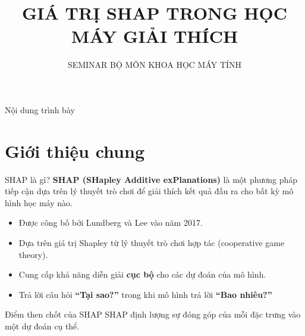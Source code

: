 \documentclass[notheorems, aspectratio=149]{beamer}
\title{GIÁ TRỊ SHAP TRONG HỌC MÁY GIẢI THÍCH}
\subtitle{SEMINAR BỘ MÔN KHOA HỌC MÁY TÍNH}
\begin{document}
\begin{frame}[plain]
    \titlepage{}
\end{frame}

\begin{frame}{Nội dung trình bày}
    \tableofcontents
\end{frame}


\section{Giới thiệu chung}

\begin{frame}{SHAP là gì?}
\textbf{SHAP (SHapley Additive exPlanations)} là một phương pháp tiếp cận dựa trên lý thuyết trò chơi để giải thích kết quả đầu ra cho bất kỳ mô hình học máy nào.

\vspace{0.5cm}
\begin{itemize}
    \item Được công bố bởi Lundberg và Lee vào năm 2017.
    \item Dựa trên giá trị Shapley từ lý thuyết trò chơi hợp tác (cooperative game theory).
    \item Cung cấp khả năng diễn giải \textbf{cục bộ} cho các dự đoán của mô hình.
    \item Trả lời câu hỏi \textbf{``Tại sao?''} trong khi mô hình trả lời \textbf{``Bao nhiêu?''}
\end{itemize}

\vspace{0.3cm}
\begin{alertblock}{Điểm then chốt của SHAP}
SHAP định lượng sự đóng góp của mỗi đặc trưng vào một dự đoán cụ thể.
\end{alertblock}
\end{frame}
\end{document}
